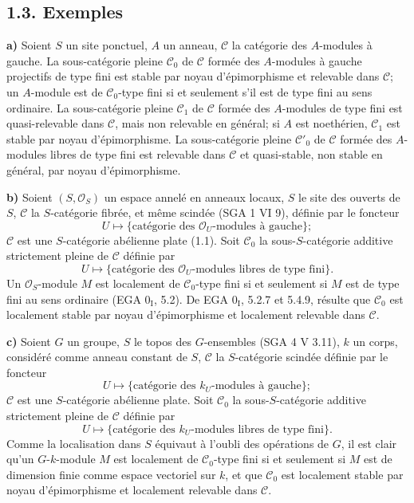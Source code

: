 \documentclass[11pt]{article}
\begin{document}
\subsection*{1.3. Exemples}

\textbf{a)} Soient \(S\) un site ponctuel, \(A\) un anneau, \(\mathcal C\) la catégorie des \(A\)-modules à gauche. La sous-catégorie pleine \(\mathcal C_0\) de \(\mathcal C\) formée des \(A\)-modules à gauche projectifs de type fini est stable par noyau d'épimorphisme et relevable dans \(\mathcal C\); un \(A\)-module est de \(\mathcal C_0\)-type fini si et seulement s'il est de type fini au sens ordinaire. La sous-catégorie pleine \(\mathcal C_1\) de \(\mathcal C\) formée des \(A\)-modules de type fini est quasi-relevable dans \(\mathcal C\), mais non relevable en général; si \(A\) est noethérien, \(\mathcal C_1\) est stable par noyau d'épimorphisme. La sous-catégorie pleine \(\mathcal C'_0\) de \(\mathcal C\) formée des \(A\)-modules libres de type fini est relevable dans \(\mathcal C\) et quasi-stable, non stable en général, par noyau d'épimorphisme.

\textbf{b)} Soient \((S,\mathcal O_S)\) un espace annelé en anneaux locaux, \(S\) le site des ouverts de \(S\), \(\mathcal C\) la \(S\)-catégorie fibrée, et même scindée (SGA 1 VI 9), définie par le foncteur
\[
  U\longmapsto\{\text{catégorie des }\mathcal O_U\text{-modules à gauche}\};
\]
\(\mathcal C\) est une \(S\)-catégorie abélienne plate (1.1). Soit \(\mathcal C_0\) la sous-\(S\)-catégorie additive strictement pleine de \(\mathcal C\) définie par
\[
  U\longmapsto\{\text{catégorie des }\mathcal O_U\text{-modules libres de type fini}\}.
\]
Un \(\mathcal O_S\)-module \(M\) est localement de \(\mathcal C_0\)-type fini si et seulement si \(M\) est de type fini au sens ordinaire (EGA \(0_{\mathrm I}\), 5.2). De EGA \(0_{\mathrm I}\), 5.2.7 et 5.4.9, résulte que \(\mathcal C_0\) est localement stable par noyau d'épimorphisme et localement relevable dans \(\mathcal C\).

\textbf{c)} Soient \(G\) un groupe, \(S\) le topos des \(G\)-ensembles (SGA 4 V 3.11), \(k\) un corps, considéré comme anneau constant de \(S\), \(\mathcal C\) la \(S\)-catégorie scindée définie par le foncteur
\[
  U\longmapsto\{\text{catégorie des }k_U\text{-modules à gauche}\};
\]
\(\mathcal C\) est une \(S\)-catégorie abélienne plate. Soit \(\mathcal C_0\) la sous-\(S\)-catégorie additive strictement pleine de \(\mathcal C\) définie par
\[
  U\longmapsto\{\text{catégorie des }k_U\text{-modules libres de type fini}\}.
\]
Comme la localisation dans \(S\) équivaut à l'oubli des opérations de \(G\), il est clair qu'un \(G\)-\(k\)-module \(M\) est localement de \(\mathcal C_0\)-type fini si et seulement si \(M\) est de dimension finie comme espace vectoriel sur \(k\), et que \(\mathcal C_0\) est localement stable par noyau d'épimorphisme et localement relevable dans \(\mathcal C\).
\end{document}
